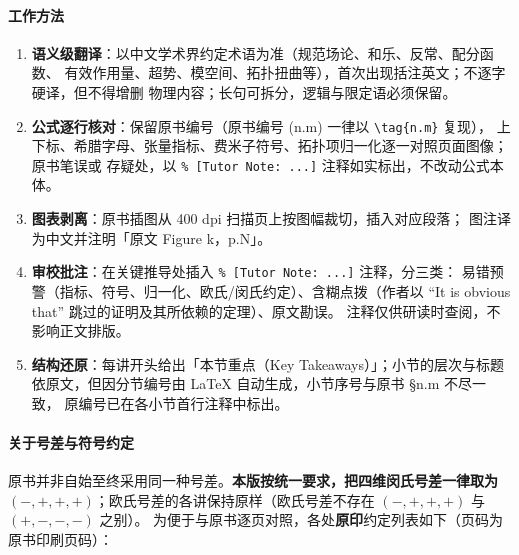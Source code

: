 \documentclass[11pt,a4paper]{article}
\theoremstyle{remark}
\theoremstyle{definition}
\theoremstyle{plain}
\begin{document}
\paragraph{工作方法}
\begin{enumerate}[label=\arabic*.]
  \item \textbf{语义级翻译}：以中文学术界约定术语为准（规范场论、和乐、反常、配分函数、
        有效作用量、超势、模空间、拓扑扭曲等），首次出现括注英文；不逐字硬译，但不得增删
        物理内容；长句可拆分，逻辑与限定语必须保留。
  \item \textbf{公式逐行核对}：保留原书编号（原书编号 (n.m) 一律以 \verb|\tag{n.m}| 复现），
        上下标、希腊字母、张量指标、费米子符号、拓扑项归一化逐一对照页面图像；原书笔误或
        存疑处，以 \verb|% [Tutor Note: ...]| 注释如实标出，不改动公式本体。
  \item \textbf{图表剥离}：原书插图从 400 dpi 扫描页上按图幅裁切，插入对应段落；
        图注译为中文并注明「原文 Figure k，p.N」。
  \item \textbf{审校批注}：在关键推导处插入 \verb|% [Tutor Note: ...]| 注释，分三类：
        易错预警（指标、符号、归一化、欧氏/闵氏约定）、含糊点拨（作者以
        ``It is obvious that'' 跳过的证明及其所依赖的定理）、原文勘误。
        注释仅供研读时查阅，不影响正文排版。
  \item \textbf{结构还原}：每讲开头给出「本节重点（Key Takeaways）」；小节的层次与标题
        依原文，但因分节编号由 \LaTeX{} 自动生成，小节序号与原书 \S n.m 不尽一致，
        原编号已在各小节首行注释中标出。
\end{enumerate}

\paragraph{关于号差与符号约定}
原书并非自始至终采用同一种号差。\textbf{本版按统一要求，把四维闵氏号差一律取为
$(-,+,+,+)$}；欧氏号差的各讲保持原样（欧氏号差不存在 $(-,+,+,+)$ 与 $(+,-,-,-)$ 之别）。
为便于与原书逐页对照，各处\textbf{原印}约定列表如下（页码为原书印刷页码）：
\end{document}
